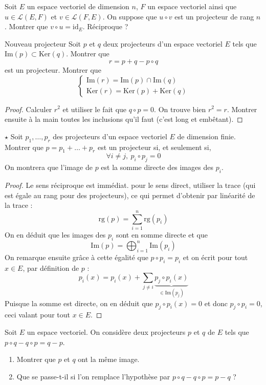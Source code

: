 \documentclass[french,a4paper]{article}
\renewcommand{\ker}{\text{Ker}}
\newcommand{\im}{\text{Im}}
\theoremstyle{plain}
\theoremstyle{definition}
\theoremstyle{remark}
\begin{document}
\begin{ex}[Moulin.EV.54]{}
	Soit $E$ un espace vectoriel de dimension $n$, $F$ un espace vectoriel ainsi que $u\in\mathcal{L}(E,F)$ et $v\in\mathcal{L}(F,E)$. On suppose que $u\circ v$ est un projecteur de rang $n$. Montrer que $v\circ u=\text{id}_E$. Réciproque ?
\end{ex}

\begin{ex}[Moulin.EV.55]{Nouveau projecteur}
	Soit $p$ et $q$ deux projecteurs d'un espace vectoriel $E$ tels que $\im(p)\subset \ker(q)$. Montrer que $$r=p+q-p\circ q$$ est un projecteur. Montrer que $$\begin{cases}
		\im(r)=\im(p)\cap\im(q) \\
		\ker(r)=\ker(p)+\ker(q)
	\end{cases}$$
\end{ex}
\begin{proof}
	Calculer $r^2$ et utiliser le fait que $q\circ p=0$. On trouve bien $r^2=r$. Montrer ensuite à la main toutes les inclusions qu'il faut (c'est long et embêtant).
\end{proof}

\begin{ex}[Moulin.EV.56]{$\star$}
	Soit $p_1,\ldots,p_r$ des projecteurs d'un espace vectoriel $E$ de dimension finie. Montrer que $p=p_1+\ldots+p_r$ est un projecteur si, et seulement si, $$\forall i\ne j,\ p_i\circ p_j=0$$ On montrera que l'image de $p$ est la somme directe des images des $p_i$.
\end{ex}
\begin{proof}
	Le sens réciproque est immédiat. pour le sens direct, utiliser la trace (qui est égale au rang pour des projecteurs), ce qui permet d'obtenir par linéarité de la trace : $$\text{rg}(p)=\sum_{i=1}^{n}\text{rg}(p_i)$$ On en déduit que les images des $p_i$ sont en somme directe et que $$\im(p)=\bigoplus_{i=1}^n\im(p_i)$$ On remarque ensuite grâce à cette égalité que $p\circ p_i=p_i$ et on écrit pour tout $x\in E$, par définition de $p$ : $$p_i(x)=p_i(x)+\sum_{j\ne i}\underbrace{p_j\circ p_i(x)}_{\in\im(p_j)}$$ Puisque la somme est directe, on en déduit que $p_j\circ p_i(x)=0$ et donc $p_j\circ p_i=0$, ceci valant pour tout $x\in E$.
\end{proof}

\begin{ex}[Moulin.EV.57]{}
	Soit $E$ un espace vectoriel. On considère deux projecteurs $p$ et $q$ de $E$ tels que $p\circ q-q\circ p=q-p$.
	\begin{enumerate}
		\item Montrer que $p$ et $q$ ont la même image.
		\item Que se passe-t-il si l'on remplace l'hypothèse par $p\circ q-q\circ p=p-q$ ?
	\end{enumerate}
\end{ex}
\end{document}
